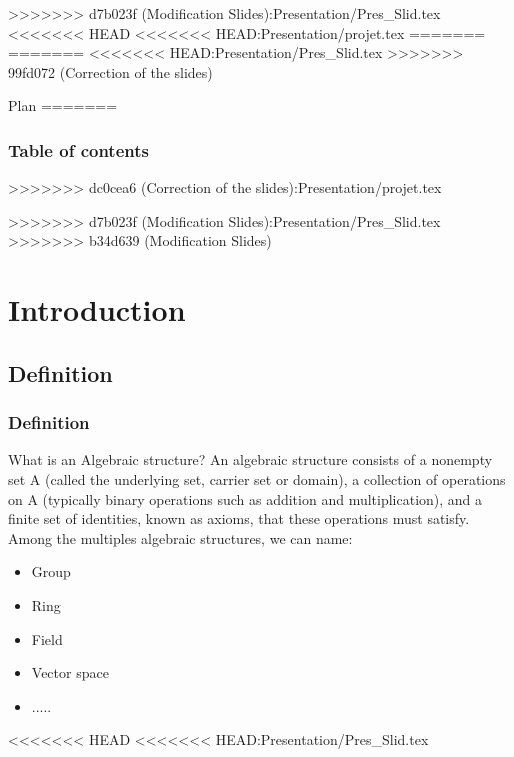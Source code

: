 \documentclass{beamer}
\begin{document}
>>>>>>> d7b023f (Modification Slides):Presentation/Pres_Slid.tex
<<<<<<< HEAD
<<<<<<< HEAD:Presentation/projet.tex
=======
=======
<<<<<<< HEAD:Presentation/Pres_Slid.tex
>>>>>>> 99fd072 (Correction of the slides)
\begin{frame}{Plan}
\tableofcontents
=======
\begin{frame}
    \frametitle{Table of contents}
    \tableofcontents
>>>>>>> dc0cea6 (Correction of the slides):Presentation/projet.tex
\end{frame}


>>>>>>> d7b023f (Modification Slides):Presentation/Pres_Slid.tex
>>>>>>> b34d639 (Modification Slides)
\section{Introduction}


\subsection{Definition}
\begin{frame}
    \frametitle{Definition}
    What is an Algebraic structure? An algebraic structure consists of a nonempty set A (called the underlying set, carrier set or domain), a collection of operations on A (typically binary operations such as addition and multiplication), and a finite set of identities, known as axioms, that these operations must satisfy.
    Among the multiples algebraic structures, we can name:
    \begin{itemize}
        \item Group
        \item Ring
        \item Field
        \item Vector space
        \item .....
    \end{itemize}
\end{frame}
<<<<<<< HEAD
<<<<<<< HEAD:Presentation/Pres_Slid.tex


\end{frame}
\end{document}

